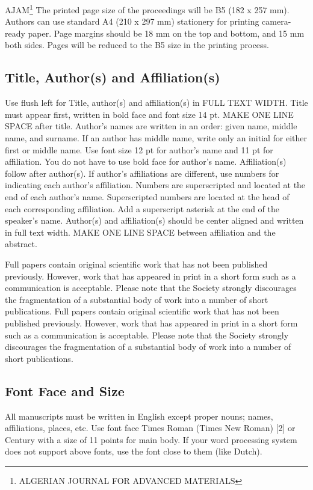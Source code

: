 \documentclass[times,twocolumn,5p]{ajam}
\begin{document}
AJAM\footnote{ALGERIAN JOURNAL FOR ADVANCED MATERIALS}
The printed page size of the proceedings will be B5 (182 x 257 mm). Authors can use standard A4 (210 x 297 mm) stationery for printing camera-ready paper. Page margins should be 18 mm on the top and bottom, and 15 mm both sides. Pages will be reduced to the B5 size in the printing process.

\subsection{\bf Title, Author(s) and Affiliation(s)}
Use flush left for Title, author(s) and affiliation(s) in FULL TEXT WIDTH. Title must appear first, written in bold face and font size 14 pt. MAKE ONE LINE SPACE after title. Author's names are written in an order: given name, middle name, and surname. If an author has middle name, write only an initial for either first or middle name. Use font size 12 pt for author's name and 11 pt for affiliation. You do not have to use bold face for author's name. Affiliation(s) follow after author(s). If author’s affiliations are different, use numbers for indicating each author's affiliation. Numbers are superscripted and located at the end of each author's name. Superscripted numbers are located at the head of each corresponding affiliation. Add a superscript asterisk at the end of the speaker’s name. Author(s) and affiliation(s) should be center aligned and written in full text width. MAKE ONE LINE SPACE between affiliation and the abstract.

Full papers contain original scientific work that has not been published previously. However, work that has appeared in print in a short form such as a communication is  acceptable. Please note that the Society strongly discourages the fragmentation of a substantial body of work into a number of short publications. Full papers contain original scientific work that has not been published previously. However, work that has appeared in print in a short form such as a communication is  acceptable. Please note that the Society strongly discourages the fragmentation of a substantial body of work into a number of short publications.

\subsection{Font Face and Size}
\label{S:2}

All manuscripts must be written in English except proper nouns; names, affiliations, places, etc. Use font face Times Roman (Times New Roman) [2] or Century with a size of 11 points for main body. If your word processing system does not support above fonts, use the font close to them (like Dutch).
\end{document}
